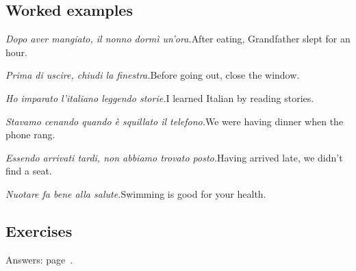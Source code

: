 \documentclass[11pt,a4paper,twoside,openright]{book}
\begin{document}
\subsection*{Worked examples}
\begin{examples}
\item\relax \textit{Dopo aver mangiato, il nonno dormì un'ora.}\newline After eating, Grandfather slept for an hour.
\item\relax \textit{Prima di uscire, chiudi la finestra.}\newline Before going out, close the window.
\item\relax \textit{Ho imparato l'italiano leggendo storie.}\newline I learned Italian by reading stories.
\item\relax \textit{Stavamo cenando quando è squillato il telefono.}\newline We were having dinner when the phone rang.
\item\relax \textit{Essendo arrivati tardi, non abbiamo trovato posto.}\newline Having arrived late, we didn't find a seat.
\item\relax \textit{Nuotare fa bene alla salute.}\newline Swimming is good for your health.
\end{examples}

\subsection*{Exercises}\label{les:infinito-gerundio:exercises}
{\color{muted}\small Answers: page~\pageref{ans:infinito-gerundio}.}
\end{document}
